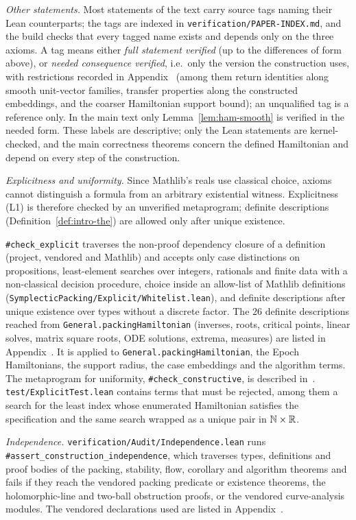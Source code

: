 \emph{Other statements.} Most statements of the text carry source tags naming their Lean counterparts; the tags are
indexed in \texttt{verification/PAPER-INDEX.md}, and the build checks that every tagged name exists and depends only on
the three axioms. A tag means either \emph{full statement verified} (up to the differences of form above), or
\emph{needed consequence verified}, i.e.\ only the version the construction uses, with restrictions recorded in
Appendix~ (among them return identities along smooth unit-vector families, transfer properties
along the constructed embeddings, and the coarser Hamiltonian support bound); an unqualified tag is a reference only.
In the main text only Lemma~\ref{lem:ham-smooth} is verified in the needed form. These
labels are descriptive; only the Lean statements are kernel-checked, and the main correctness theorems concern the
defined Hamiltonian and depend on every step of the construction.

\emph{Explicitness and uniformity.} Since Mathlib's reals use classical choice, axioms cannot distinguish a formula
from an arbitrary existential witness. Explicitness (L1) is therefore checked by an unverified metaprogram; definite descriptions (Definition~\ref{def:intro-the}) are allowed only after unique existence.


\texttt{\#check\_explicit} traverses the non-proof dependency closure of a definition (project, vendored and Mathlib) and accepts only case distinctions on propositions, least-element searches over integers, rationals and finite data with a non-classical decision procedure, choice inside an allow-list of Mathlib definitions (\texttt{SymplecticPacking/Explicit/Whitelist.lean}), and definite descriptions after unique existence over types without a discrete factor. The $26$ definite descriptions reached from \texttt{General.packingHamiltonian} (inverses, roots, critical points, linear solves, matrix square roots, ODE solutions, extrema, measures) are listed in Appendix~. It is applied to \texttt{General.packingHamiltonian}, the Epoch Hamiltonians, the support radius, the case embeddings and the algorithm terms. The metaprogram for uniformity, \texttt{\#check\_constructive}, is described in~\cite{SongHD}. \texttt{test/ExplicitTest.lean} contains terms that must be rejected, among them a search for the least index whose enumerated Hamiltonian satisfies the specification and the same search wrapped as a unique pair in $\mathbb{N}\times\mathbb{R}$.

\emph{Independence.} \texttt{verification/Audit/Independence.lean} runs \texttt{\#assert\_construction\_independence}, which traverses types, definitions and proof bodies of the packing, stability, flow, corollary and algorithm theorems and fails if they reach the vendored packing predicate or existence theorems, the holomorphic-line and two-ball obstruction proofs, or the vendored curve-analysis modules. The vendored declarations used are listed in Appendix~.

